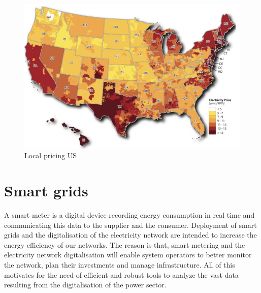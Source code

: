 \begin{figure}[!h]
    \includegraphics[width=\textwidth]{images/us_local.png}
    \caption{Local pricing US \cite{us_local}}
    \label{fig:us_local}
\end{figure}

\section{Smart grids}
A smart meter is a digital device recording energy consumption in real time and communicating this data to the supplier and the consumer.
Deployment of smart grids and the digitalisation of the electricity network are intended to increase the energy efficiency of our networks.
The reason is that, smart metering and the electricity network digitalisation  will enable system operators to better monitor the network, plan their investments and manage infrastructure. 
All of this motivates for the need of efficient and robust tools to analyze the vast data resulting from the digitalisation of the power sector.

